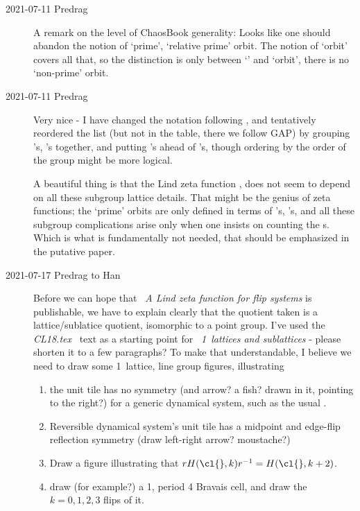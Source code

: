 \begin{description}
\item[2021-07-11 Predrag]
A remark on the level of ChaosBook generality: Looks like one should abandon
the notion of `prime', `relative prime' orbit. The notion of `orbit' covers
all that, so the distinction is only between `{\lattstate}' and `orbit',
there is no `non-prime' orbit.

\item[2021-07-11 Predrag]
Very nice - I have changed the notation following , and
tentatively reordered the list (but not in the table, there we follow GAP) by
grouping \Cn{\cl{}}'s, \Dn{\cl{}}'s together, and putting 's ahead of
's, though ordering by the order of the group might be more logical.

A beautiful thing is that the Lind zeta function ,
 does not seem to depend on all these subgroup
lattice details. That might be the genius of zeta functions; the `prime'
orbits are only defined in terms of \Cn{\cl{}}'s, \Dn{\cl{}}'s, and all these
subgroup complications arise only when one insists on counting the {\lattstate}s. Which is what is fundamentally not needed, that should be emphasized
in the putative paper.

\item[2021-07-17 Predrag to Han]
Before we can hope that
~{\em A Lind zeta function for flip systems}
is publishable, we have to explain clearly that the quotient
taken is a lattice/sublatice quotient, isomorphic to a point group.
I've used the \emph{CL18.tex} \catlatt\ text as a starting point
for ~{\em 1\dmn\ lattices and sublattices} -
please shorten it to a few paragraphs?
To make that understandable, I believe we need to draw some
1\dmn\ lattice, line group figures, illustrating
\begin{enumerate}
  \item
the unit tile has no symmetry (and arrow? a fish? drawn in it, pointing
to the right?) for a generic dynamical system, such as the usual
\HenonMap.
  \item
Reversible dynamical system's unit tile has a midpoint and edge-flip
reflection symmetry (draw left-right arrow? moustache?)
  \item
Draw a figure illustrating that $r H(\cl{},k) r^{-1} = H(\cl{},k+2)$.
  \item
draw (for example?) a 1\dmn,  period 4 Bravais cell, and draw
the  $k=0,1,2,3$ flips of it.
\end{enumerate}


\end{description}
